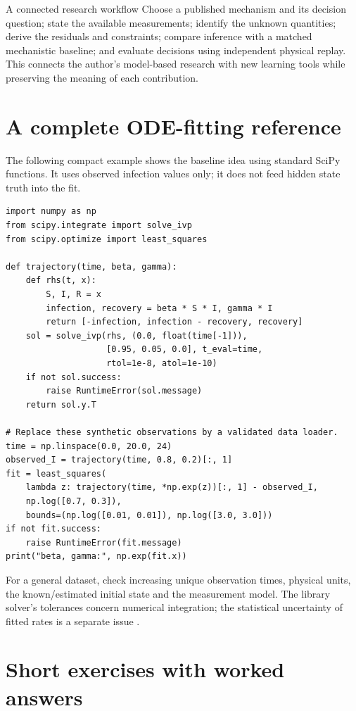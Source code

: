\documentclass[11pt,a4paper]{article}
\theoremstyle{definition}
\theoremstyle{remark}
\begin{document}
\begin{keyidea}{A connected research workflow}
Choose a published mechanism and its decision question; state the available measurements; identify the unknown quantities; derive the residuals and constraints; compare inference with a matched mechanistic baseline; and evaluate decisions using independent physical replay. This connects the author's model-based research with new learning tools while preserving the meaning of each contribution.
\end{keyidea}

\appendix
\section{A complete ODE-fitting reference}
The following compact example shows the baseline idea using standard SciPy functions. It uses observed infection values only; it does not feed hidden state truth into the fit.
\begin{lstlisting}[caption={Mechanistic fitting with the same observation operator}]
import numpy as np
from scipy.integrate import solve_ivp
from scipy.optimize import least_squares

def trajectory(time, beta, gamma):
    def rhs(t, x):
        S, I, R = x
        infection, recovery = beta * S * I, gamma * I
        return [-infection, infection - recovery, recovery]
    sol = solve_ivp(rhs, (0.0, float(time[-1])),
                    [0.95, 0.05, 0.0], t_eval=time,
                    rtol=1e-8, atol=1e-10)
    if not sol.success:
        raise RuntimeError(sol.message)
    return sol.y.T

# Replace these synthetic observations by a validated data loader.
time = np.linspace(0.0, 20.0, 24)
observed_I = trajectory(time, 0.8, 0.2)[:, 1]
fit = least_squares(
    lambda z: trajectory(time, *np.exp(z))[:, 1] - observed_I,
    np.log([0.7, 0.3]),
    bounds=(np.log([0.01, 0.01]), np.log([3.0, 3.0]))
if not fit.success:
    raise RuntimeError(fit.message)
print("beta, gamma:", np.exp(fit.x))
\end{lstlisting}
For a general dataset, check increasing unique observation times, physical units, the known/estimated initial state and the measurement model. The library solver's tolerances concern numerical integration; the statistical uncertainty of fitted rates is a separate issue \cite{scipy}.

\section{Short exercises with worked answers}
\end{document}
